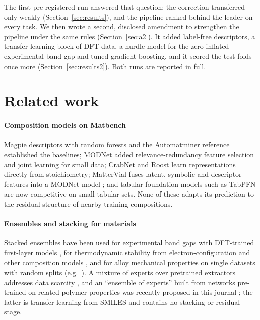 The first pre-registered run answered that question: the correction transferred only weakly (Section~\ref{sec:results}), and the pipeline ranked behind the leader on every task.
We then wrote a second, disclosed amendment to strengthen the pipeline under the same rules (Section~\ref{sec:a2}). It added label-free descriptors, a transfer-learning block of DFT data, a hurdle model for the zero-inflated experimental band gap and tuned gradient boosting, and it scored the test folds once more (Section~\ref{sec:results2}).
Both runs are reported in full.

\section{Related work}
\label{sec:related}

\paragraph{Composition models on Matbench}
Magpie descriptors with random forests \citep{ward2016magpie} and the Automatminer reference \citep{dunn2020matbench} established the baselines; MODNet \citep{debreuck2021modnet,debreuck2021bias} added relevance-redundancy feature selection and joint learning for small data; CrabNet \citep{wang2021crabnet} and Roost \citep{goodall2020roost} learn representations directly from stoichiometry; MatterVial fuses latent, symbolic and descriptor features into a MODNet model \citep{gouvea2025mattervial}; and tabular foundation models such as TabPFN \citep{hollmann2025tabpfn} are now competitive on small tabular sets.
None of these adapts its prediction to the residual structure of nearby training compositions.

\paragraph{Ensembles and stacking for materials}
Stacked ensembles have been used for experimental band gaps with DFT-trained first-layer models \citep{kauwe2020bandgap}, for thermodynamic stability from electron-configuration and other composition models \citep{zou2025ecsg}, and for alloy mechanical properties on single datasets with random splits (e.g.\ \citealp{zhao2025hea}).
A mixture of experts over pretrained extractors addresses data scarcity \citep{chang2022moe}, and an ``ensemble of experts'' built from networks pre-trained on related polymer properties was recently proposed in this journal \citep{miccio2025ee}; the latter is transfer learning from SMILES and contains no stacking or residual stage.


